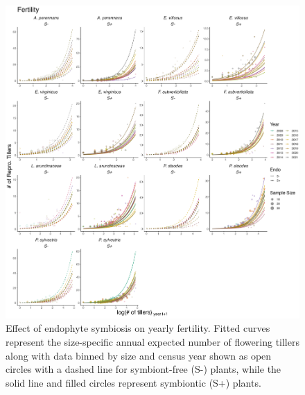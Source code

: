 \documentclass[9pt,twoside,lineno]{pnas-new}
\begin{document}
\begin{figure}
	\centering
	\includegraphics[width=\linewidth]{fert_yearplot.png}
	\caption{Effect of endophyte symbiosis on yearly fertility. Fitted curves represent the size-specific annual expected number of flowering tillers along with data binned by size and census year shown as open circles with a dashed line for symbiont-free (S-) plants, while the solid line and filled circles represent symbiontic (S+) plants.}
\end{figure}
\end{document}
